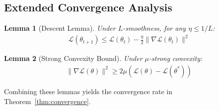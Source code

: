\documentclass[12pt, a4paper]{article}
\newtheorem{lemma}{Lemma}
\begin{document}
\subsection{Extended Convergence Analysis}

\begin{lemma}[Descent Lemma]
Under $L$-smoothness, for any $\eta \leq 1/L$:
\begin{align}
\mathcal{L}(\theta_{t+1}) \leq \mathcal{L}(\theta_t) - \frac{\eta}{2}\|\nabla \mathcal{L}(\theta_t)\|^2
\end{align}
\end{lemma}

\begin{lemma}[Strong Convexity Bound]
Under $\mu$-strong convexity:
\begin{align}
\|\nabla \mathcal{L}(\theta)\|^2 \geq 2\mu(\mathcal{L}(\theta) - \mathcal{L}(\theta^*))
\end{align}
\end{lemma}

Combining these lemmas yields the convergence rate in Theorem~\ref{thm:convergence}.
\end{document}

